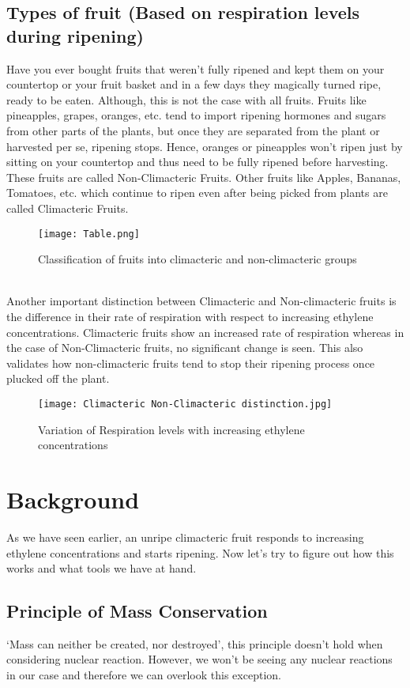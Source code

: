 \documentclass[10pt, a4paper]{article}
\begin{document}
\subsection{Types of fruit (Based on respiration levels during ripening)}
Have you ever bought fruits that weren’t fully ripened and kept them on your countertop or your fruit basket and in a few days they magically turned ripe, ready to be eaten. Although, this is not the case with all fruits. Fruits like pineapples, grapes, oranges, etc. tend to import ripening hormones and sugars from other parts of the plants, but once they are separated from the plant or harvested per se, ripening stops. Hence, oranges or pineapples won’t ripen just by sitting on your countertop and thus need to be fully ripened before harvesting. These fruits are called Non-Climacteric Fruits. Other fruits like Apples, Bananas, Tomatoes, etc. which continue to ripen even after being picked from plants are called Climacteric Fruits.
\begin{figure}[H]
    \centering
    \texttt{[image: Table.png]}
    \caption{Classification of fruits into climacteric and non-climacteric groups}
\end{figure}
\cite{paul2012fading} \\

Another important distinction between Climacteric and Non-climacteric fruits is the difference in their rate of respiration with respect to increasing ethylene concentrations. Climacteric fruits show an increased rate of respiration whereas in the case of Non-Climacteric fruits, no significant change is seen. This also validates how non-climacteric fruits tend to stop their ripening process once plucked off the plant.
\begin{figure}[H]
    \centering
    \texttt{[image: Climacteric Non-Climacteric distinction.jpg]}
    \caption{Variation of Respiration levels with increasing ethylene concentrations}
\end{figure}

\newpage
\section{Background}
As we have seen earlier, an unripe climacteric fruit responds to increasing ethylene concentrations and starts ripening. Now let’s try to figure out how this works and what tools we have at hand.

\subsection{Principle of Mass Conservation}
‘Mass can neither be created, nor destroyed’, this principle doesn’t hold when considering nuclear reaction. However, we won’t be seeing any nuclear reactions in our case and therefore we can overlook this exception. \\
\end{document}
